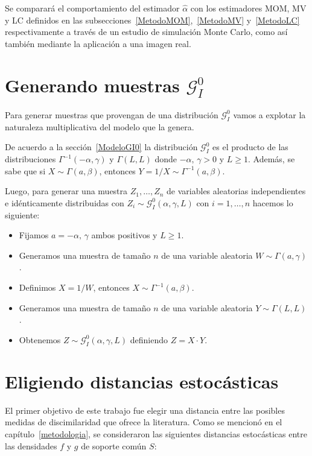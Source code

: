 Se comparará el comportamiento del estimador $\widehat{\alpha}$ con los estimadores MOM, MV y LC definidos en las subsecciones~\ref{MetodoMOM},~\ref{MetodoMV} y~\ref{MetodoLC} respectivamente a través de un estudio de simulación Monte Carlo, como así también mediante la aplicación a una imagen real.

\section{Generando muestras $\mathcal{G}_I^0$}

Para generar muestras que provengan de una distribución $\mathcal{G}_I^0$ vamos a explotar la naturaleza multiplicativa del modelo que la genera.

De acuerdo a la sección~\ref{ModeloGI0} la distribución  $\mathcal{G}_I^0$ es el producto de las distribuciones $\Gamma^{-1}(-\alpha,\gamma)$ y $\Gamma(L,L)$ donde $-\alpha, \, \gamma >0$ y $L\geq 1$. Además, se sabe que si $X \sim \Gamma(a,\beta)$, entonces $Y = 1/X \sim \Gamma^{-1}(a,\beta)$.

Luego, para generar una muestra $Z_1, \ldots, Z_n$ de variables aleatorias independientes e idénticamente distribuidas con $Z_i \sim \mathcal{G}_I^0(\alpha,\gamma,L)$ con $i=1, \ldots, n$ hacemos lo siguiente:
\begin{itemize}
	\item Fijamos $a=-\alpha, \, \gamma$ ambos positivos y $L \geq 1$.
	\item Generamos una muestra de tamaño $n$ de una variable aleatoria $W \sim \Gamma(a,\gamma)$.
	\item Definimos $X=1/W$, entonces $X \sim \Gamma^{-1}(a,\beta)$.
	\item Generamos una muestra de tamaño $n$ de una variable aleatoria $Y \sim \Gamma(L,L)$.
	\item Obtenemos $Z \sim \mathcal{G}_I^0(\alpha,\gamma,L)$ definiendo $Z=X \cdot Y$.
\end{itemize}


\section{Eligiendo distancias estocásticas}
\label{EligiendoDistancias}

El primer objetivo de este trabajo fue elegir una distancia entre las posibles medidas de discimilaridad que ofrece la literatura. Como se mencionó en el capítulo~\ref{metodologia}, se consideraron las siguientes distancias estocásticas entre las densidades $f$ y $g$ de soporte común $S$:

